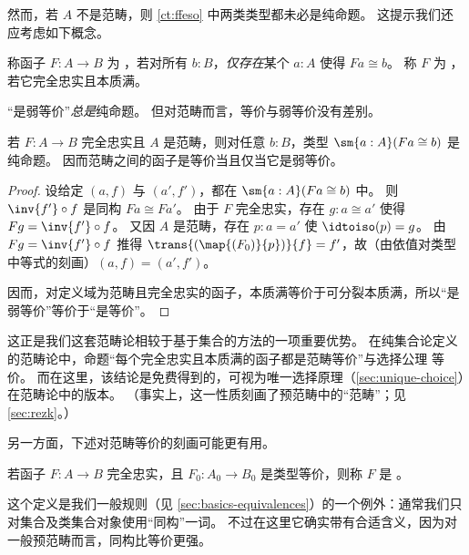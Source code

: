 然而，若 $A$ 不是范畴，则 \cref{ct:ffeso} 中两类类型都未必是纯命题。
这提示我们还应考虑如下概念。

\begin{defn}\label{ct:essentially-surjective}
  称函子 $F:A\to B$ 为
  ，若对所有 $b:B$，\emph{仅存在}某个 $a:A$ 使得 $Fa\cong b$。
  称 $F$ 为
  ，若它完全忠实且本质满。
\end{defn}

“是弱等价”\emph{总是}纯命题。
但对范畴而言，等价与弱等价没有差别。

\begin{lem}\label{ct:catweq}
  若 $F:A\to B$ 完全忠实且 $A$ 是范畴，则对任意 $b:B$，类型 $\sm{a:A} (Fa\cong b)$ 是纯命题。
  因而范畴之间的函子是等价当且仅当它是弱等价。
\end{lem}
\begin{proof}
  设给定 $(a,f)$ 与 $(a',f')$，都在 $\sm{a:A} (Fa\cong b)$ 中。
  则 $\inv{f'}\circ f$ 是同构 $Fa \cong Fa'$。
  由于 $F$ 完全忠实，存在 $g:a\cong a'$ 使得 $Fg = \inv{f'}\circ f$。
  又因 $A$ 是范畴，存在 $p:a=a'$ 使 $\idtoiso(p)=g$。
  由 $Fg = \inv{f'}\circ f$ 推得 $\trans{(\map{(F_0)}{p})}{f} = f'$，故（由依值对类型中等式的刻画）$(a,f)=(a',f')$。

  因而，对定义域为范畴且完全忠实的函子，本质满等价于可分裂本质满，所以“是弱等价”等价于“是等价”。
\end{proof}

这正是我们这套范畴论相较于基于集合的方法的一项重要优势。
在纯集合论定义的范畴论中，命题“每个完全忠实且本质满的函子都是范畴等价”与选择公理 \choice{} 等价。
而在这里，该结论是免费得到的，可视为唯一选择原理（\cref{sec:unique-choice}）在范畴论中的版本。
（事实上，这一性质刻画了预范畴中的“范畴”；见 \cref{sec:rezk}。）

另一方面，下述对范畴等价的刻画可能更有用。

\begin{defn}\label{ct:isocat}
  若函子 $F:A\to B$ 完全忠实，且 $F_0:A_0\to B_0$ 是类型等价，则称 $F$ 是
  。
\end{defn}

这个定义是我们一般规则（见 \cref{sec:basics-equivalences}）的一个例外：通常我们只对集合及类集合对象使用“同构”一词。
不过在这里它确实带有合适含义，因为对一般预范畴而言，同构比等价更强。

